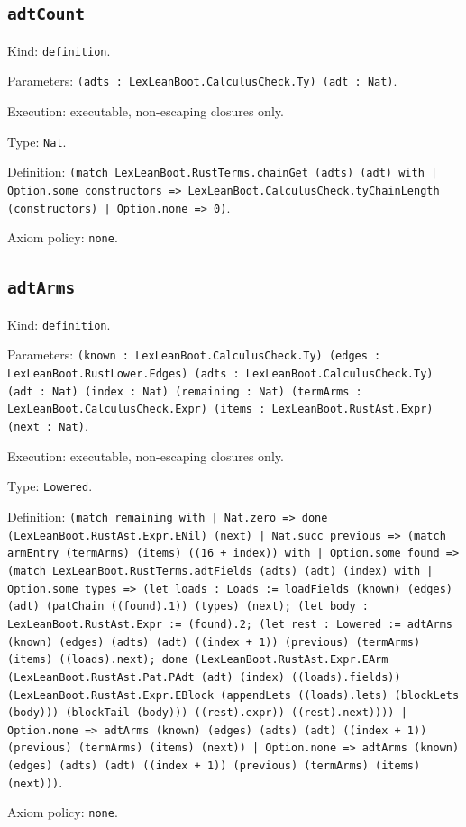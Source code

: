 \documentclass[11pt]{article}
\begin{document}
\subsection*{\texttt{adtCount}}
\noindent Kind: \texttt{definition}.\par
\noindent Parameters: \texttt{(adts : LexLeanBoot.CalculusCheck.Ty) (adt : Nat)}.\par
\noindent Execution: executable, non-escaping closures only.\par
\noindent Type: \texttt{Nat}.\par
\noindent Definition: \texttt{(match LexLeanBoot.RustTerms.chainGet (adts) (adt) with | Option.some constructors => LexLeanBoot.CalculusCheck.tyChainLength (constructors) | Option.none => 0)}.\par
\noindent Axiom policy: \texttt{none}.\par
\subsection*{\texttt{adtArms}}
\noindent Kind: \texttt{definition}.\par
\noindent Parameters: \texttt{(known : LexLeanBoot.CalculusCheck.Ty) (edges : LexLeanBoot.RustLower.Edges) (adts : LexLeanBoot.CalculusCheck.Ty) (adt : Nat) (index : Nat) (remaining : Nat) (termArms : LexLeanBoot.CalculusCheck.Expr) (items : LexLeanBoot.RustAst.Expr) (next : Nat)}.\par
\noindent Execution: executable, non-escaping closures only.\par
\noindent Type: \texttt{Lowered}.\par
\noindent Definition: \texttt{(match remaining with | Nat.zero => done (LexLeanBoot.RustAst.Expr.ENil) (next) | Nat.succ previous => (match armEntry (termArms) (items) ((16 + index)) with | Option.some found => (match LexLeanBoot.RustTerms.adtFields (adts) (adt) (index) with | Option.some types => (let loads : Loads := loadFields (known) (edges) (adt) (patChain ((found).1)) (types) (next); (let body : LexLeanBoot.RustAst.Expr := (found).2; (let rest : Lowered := adtArms (known) (edges) (adts) (adt) ((index + 1)) (previous) (termArms) (items) ((loads).next); done (LexLeanBoot.RustAst.Expr.EArm (LexLeanBoot.RustAst.Pat.PAdt (adt) (index) ((loads).fields)) (LexLeanBoot.RustAst.Expr.EBlock (appendLets ((loads).lets) (blockLets (body))) (blockTail (body))) ((rest).expr)) ((rest).next)))) | Option.none => adtArms (known) (edges) (adts) (adt) ((index + 1)) (previous) (termArms) (items) (next)) | Option.none => adtArms (known) (edges) (adts) (adt) ((index + 1)) (previous) (termArms) (items) (next)))}.\par
\noindent Axiom policy: \texttt{none}.\par
\end{document}
